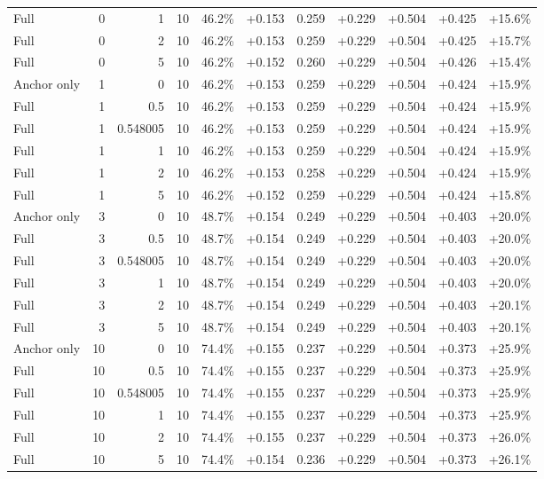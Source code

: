 \begin{table}[htbp]
\begin{tabular}{lrrrccccccc}
Full & 0 & 1 & 10 & 46.2\% & +0.153 & 0.259 & +0.229 & +0.504 & +0.425 & +15.6\% \\
Full & 0 & 2 & 10 & 46.2\% & +0.153 & 0.259 & +0.229 & +0.504 & +0.425 & +15.7\% \\
Full & 0 & 5 & 10 & 46.2\% & +0.152 & 0.260 & +0.229 & +0.504 & +0.426 & +15.4\% \\
Anchor only & 1 & 0 & 10 & 46.2\% & +0.153 & 0.259 & +0.229 & +0.504 & +0.424 & +15.9\% \\
Full & 1 & 0.5 & 10 & 46.2\% & +0.153 & 0.259 & +0.229 & +0.504 & +0.424 & +15.9\% \\
Full & 1 & 0.548005 & 10 & 46.2\% & +0.153 & 0.259 & +0.229 & +0.504 & +0.424 & +15.9\% \\
Full & 1 & 1 & 10 & 46.2\% & +0.153 & 0.259 & +0.229 & +0.504 & +0.424 & +15.9\% \\
Full & 1 & 2 & 10 & 46.2\% & +0.153 & 0.258 & +0.229 & +0.504 & +0.424 & +15.9\% \\
Full & 1 & 5 & 10 & 46.2\% & +0.152 & 0.259 & +0.229 & +0.504 & +0.424 & +15.8\% \\
Anchor only & 3 & 0 & 10 & 48.7\% & +0.154 & 0.249 & +0.229 & +0.504 & +0.403 & +20.0\% \\
Full & 3 & 0.5 & 10 & 48.7\% & +0.154 & 0.249 & +0.229 & +0.504 & +0.403 & +20.0\% \\
Full & 3 & 0.548005 & 10 & 48.7\% & +0.154 & 0.249 & +0.229 & +0.504 & +0.403 & +20.0\% \\
Full & 3 & 1 & 10 & 48.7\% & +0.154 & 0.249 & +0.229 & +0.504 & +0.403 & +20.0\% \\
Full & 3 & 2 & 10 & 48.7\% & +0.154 & 0.249 & +0.229 & +0.504 & +0.403 & +20.1\% \\
Full & 3 & 5 & 10 & 48.7\% & +0.154 & 0.249 & +0.229 & +0.504 & +0.403 & +20.1\% \\
Anchor only & 10 & 0 & 10 & 74.4\% & +0.155 & 0.237 & +0.229 & +0.504 & +0.373 & +25.9\% \\
Full & 10 & 0.5 & 10 & 74.4\% & +0.155 & 0.237 & +0.229 & +0.504 & +0.373 & +25.9\% \\
Full & 10 & 0.548005 & 10 & 74.4\% & +0.155 & 0.237 & +0.229 & +0.504 & +0.373 & +25.9\% \\
Full & 10 & 1 & 10 & 74.4\% & +0.155 & 0.237 & +0.229 & +0.504 & +0.373 & +25.9\% \\
Full & 10 & 2 & 10 & 74.4\% & +0.155 & 0.237 & +0.229 & +0.504 & +0.373 & +26.0\% \\
Full & 10 & 5 & 10 & 74.4\% & +0.154 & 0.236 & +0.229 & +0.504 & +0.373 & +26.1\% \\

\end{tabular}
\end{table}
